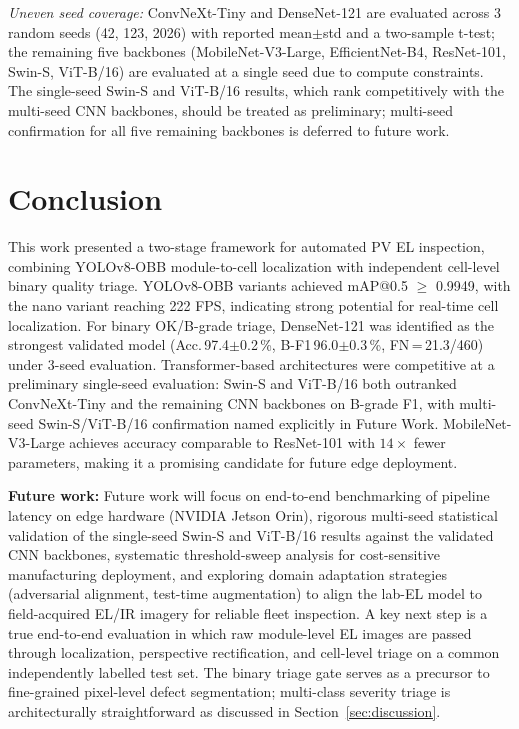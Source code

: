 \documentclass[conference]{IEEEtran}
\begin{document}
\textit{Uneven seed coverage:} ConvNeXt-Tiny and DenseNet-121 are evaluated across 3 random seeds (42, 123, 2026) with reported mean$\pm$std and a two-sample t-test; the remaining five backbones (MobileNet-V3-Large, EfficientNet-B4, ResNet-101, Swin-S, ViT-B/16) are evaluated at a single seed due to compute constraints. The single-seed Swin-S and ViT-B/16 results, which rank competitively with the multi-seed CNN backbones, should be treated as preliminary; multi-seed confirmation for all five remaining backbones is deferred to future work.

\section{Conclusion}
\label{sec:conclusion}

This work presented a two-stage framework for automated PV EL inspection, combining YOLOv8-OBB module-to-cell localization with independent cell-level binary quality triage. YOLOv8-OBB variants achieved mAP@0.5 $\geq$ 0.9949, with the nano variant reaching 222 FPS, indicating strong potential for real-time cell localization. For binary OK/B-grade triage, DenseNet-121 was identified as the strongest validated model (Acc.\,97.4$\pm$0.2\,\%, B-F1\,96.0$\pm$0.3\,\%, FN\,=\,21.3/460) under 3-seed evaluation. Transformer-based architectures were competitive at a preliminary single-seed evaluation: Swin-S and ViT-B/16 both outranked ConvNeXt-Tiny and the remaining CNN backbones on B-grade F1, with multi-seed Swin-S/ViT-B/16 confirmation named explicitly in Future Work. MobileNet-V3-Large achieves accuracy comparable to ResNet-101 with $14\times$ fewer parameters, making it a promising candidate for future edge deployment.

\textbf{Future work:} Future work will focus on end-to-end benchmarking of pipeline latency on edge hardware (NVIDIA Jetson Orin), rigorous multi-seed statistical validation of the single-seed Swin-S and ViT-B/16 results against the validated CNN backbones, systematic threshold-sweep analysis for cost-sensitive manufacturing deployment, and exploring domain adaptation strategies (adversarial alignment, test-time augmentation) to align the lab-EL model to field-acquired EL/IR imagery for reliable fleet inspection. A key next step is a true end-to-end evaluation in which raw module-level EL images are passed through localization, perspective rectification, and cell-level triage on a common independently labelled test set.
The binary triage gate serves as a precursor to fine-grained pixel-level defect segmentation; multi-class severity triage is architecturally straightforward as discussed in Section~\ref{sec:discussion}.


{\small


}
\end{document}
